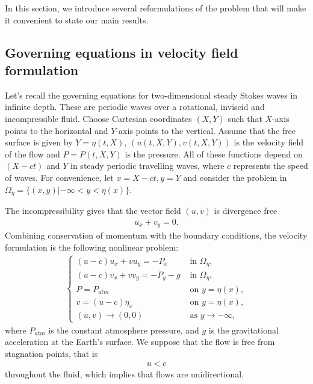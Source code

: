 \documentclass[11pt,reqno]{amsart}
\numberwithin{equation}{section}
\theoremstyle{definition}
\theoremstyle{remark}
\begin{document}
In this section, we introduce several reformulations of the problem
that will make it convenient to state our main results.

\subsection{Governing equations in velocity field formulation}

Let's recall the governing equations for two-dimensional steady
Stokes waves in infinite depth. These are periodic waves over a
rotational, inviscid and incompressible fluid. Choose Cartesian
coordinates $(X,Y)$ such that $X$-axis points to the horizontal and
$Y$-axis points to the vertical. Assume that the free surface is
given by $Y=\eta(t,X)$, $(u(t,X,Y), v(t,X,Y))$ is the velocity field
of the flow and $P=P(t,X,Y)$ is the pressure. All of these functions
depend on $(X-ct)$ and $Y$ in steady periodic travelling waves,
where $c$ represents the speed of waves. For convenience, let
$x=X-ct, y=Y$ and consider the problem in
$\Omega_\eta=\{(x,y)|-\infty<y<\eta(x)\}$.

The incompressibility gives that the vector field $(u,v)$ is
divergence free
\begin{eqnarray}
u_{x}+v_{y}=0. \label{eq2.1}
\end{eqnarray}
Combining conservation of momentum with the boundary conditions, the
velocity formulation is the following nonlinear problem:
\begin{eqnarray}
\left\{\begin{array}{llll}
{(u-c) u_{x}+  v u_{y}=-P_{x}} & {\text { in } \Omega_{\eta}}, \\
{(u-c) v_{x}+ v v_{y}=-P_{y}-g} & { \text { in } \Omega_{\eta}}, \\
{P=P_{atm}} & {\text { on } y=\eta(x)}, \\
{v=(u-c) \eta_{x}} & {\text { on } y=\eta(x)}, \\
{(u,v)\rightarrow (0,0)} & {\text { as } y\rightarrow
-\infty},\end{array}\right. \label{eq2.2}
\end{eqnarray}
where $P_{atm}$ is the constant atmosphere pressure, and $g$ is the
gravitational acceleration at the Earth's surface. We suppose that
the flow is free from stagnation points, that is
\begin{eqnarray}
 u<c \label{eq2.3}
\end{eqnarray}
throughout the fluid, which implies that flows are unidirectional.
\end{document}

